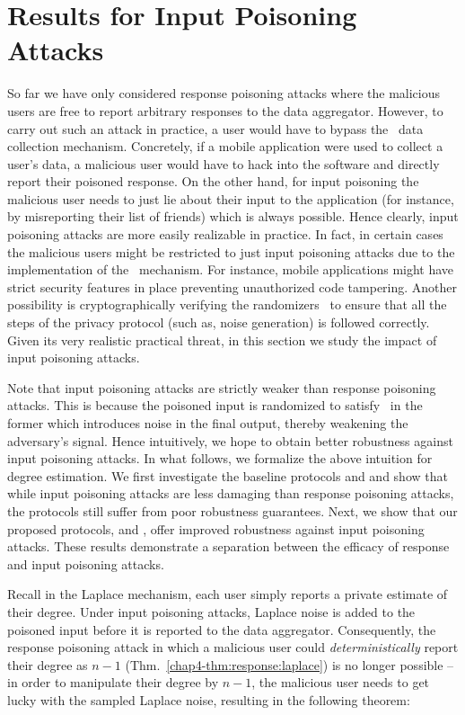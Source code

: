 \section{Results for Input Poisoning Attacks}\label{chap4-sec:input-attacks}
So far we have only considered response poisoning attacks where the malicious users are free to report arbitrary responses to the data aggregator. However, to carry out such an attack in practice, a user would have to bypass the \ldp~data collection mechanism. Concretely, if a mobile application were used to collect a user's data, a malicious user would have to hack into the software and directly report their poisoned response. On the other hand, for input poisoning the malicious user needs to just lie about their input  to the application (for instance, by misreporting their list of friends) which is always possible. Hence clearly, input poisoning attacks are more easily realizable in practice. In fact, in certain cases the malicious users might be restricted to just input poisoning attacks due to the implementation of the \ldp~mechanism. For instance, mobile applications might have strict security features in place preventing unauthorized code tampering.  Another possibility is cryptographically verifying the randomizers~\cite{Kato21} to ensure that all the steps of the privacy protocol (such as, noise generation) is followed correctly.  Given its very realistic practical threat, in this section we study the impact of input poisoning attacks. 

Note that input poisoning attacks are strictly weaker than response poisoning attacks. This is because the poisoned input is randomized  to satisfy \ldp~in the former which introduces noise in the final output, thereby weakening the adversary's signal. Hence intuitively, we hope to obtain better robustness against input poisoning attacks.  In what follows, we formalize the above intuition for degree estimation. We first investigate the baseline protocols \RLap{} and \DegRRNaive{} and show that while input poisoning attacks are less damaging than response poisoning attacks, the protocols still suffer from poor robustness guarantees. Next, we show that our proposed protocols, \DegRRCheck{} and \DegHybrid{}, offer improved robustness against input poisoning attacks. These results demonstrate a separation between the efficacy of response and input poisoning attacks.

Recall in the Laplace mechanism, each user simply reports a private estimate of their degree. Under input poisoning attacks, Laplace noise is added to the poisoned input before it is reported to the data aggregator. Consequently, the response poisoning attack in which a malicious user could \textit{deterministically} report their degree as $n-1$ (Thm.~\ref{chap4-thm:response:laplace}) is no longer possible -- in order to manipulate their degree by $n-1$, the malicious user needs to get lucky with the sampled Laplace noise, resulting in the following theorem:

